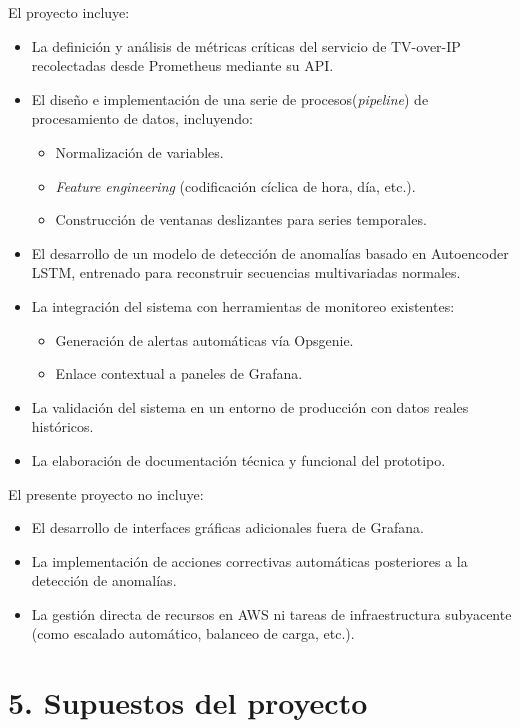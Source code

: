 \documentclass[
11pt, %
]{charter}
\begin{document}
El proyecto incluye:
\begin{itemize}
    \item La definición y análisis de métricas críticas del servicio de TV-over-IP recolectadas desde Prometheus mediante su API.
    \item El diseño e implementación de una serie de procesos(\textit{pipeline}) de procesamiento de datos, incluyendo:
    \begin{itemize}
        \item Normalización de variables.
        \item \textit{Feature engineering} (codificación cíclica de hora, día, etc.).
        \item Construcción de ventanas deslizantes para series temporales.
    \end{itemize}
    \item El desarrollo de un modelo de detección de anomalías basado en Autoencoder LSTM, entrenado para reconstruir secuencias multivariadas normales.
    \item La integración del sistema con herramientas de monitoreo existentes:
    \begin{itemize}
        \item Generación de alertas automáticas vía Opsgenie.
        \item Enlace contextual a paneles de Grafana.
    \end{itemize}
    \item La validación del sistema en un entorno de producción con datos reales históricos.
    \item La elaboración de documentación técnica y funcional del prototipo.
\end{itemize}
El presente proyecto no incluye:

\begin{itemize}
    \item El desarrollo de interfaces gráficas adicionales fuera de Grafana.
    \item La implementación de acciones correctivas automáticas posteriores a la detección de anomalías.
    \item La gestión directa de recursos en AWS ni tareas de infraestructura subyacente (como escalado automático, balanceo de carga, etc.).
\end{itemize}



\section{5. Supuestos del proyecto}
\label{sec:supuestos}
\end{document}
